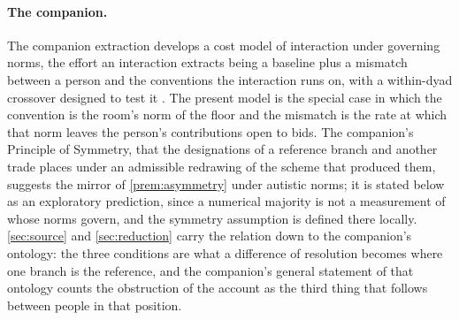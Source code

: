 \paragraph{The companion.} The companion extraction develops a cost model of interaction under governing norms, the effort an interaction extracts being a baseline plus a mismatch between a person and the conventions the interaction runs on, with a within-dyad crossover designed to test it \cite{NormCost}. The present model is the special case in which the convention is the room's norm of the floor and the mismatch is the rate at which that norm leaves the person's contributions open to bids. The companion's Principle of Symmetry, that the designations of a reference branch and another trade places under an admissible redrawing of the scheme that produced them, suggests the mirror of \autoref{prem:asymmetry} under autistic norms; it is stated below as an exploratory prediction, since a numerical majority is not a measurement of whose norms govern, and the symmetry assumption is defined there locally. \autoref{sec:source} and \autoref{sec:reduction} carry the relation down to the companion's ontology: the three conditions are what a difference of resolution becomes where one branch is the reference, and the companion's general statement of that ontology counts the obstruction of the account as the third thing that follows between people in that position.

